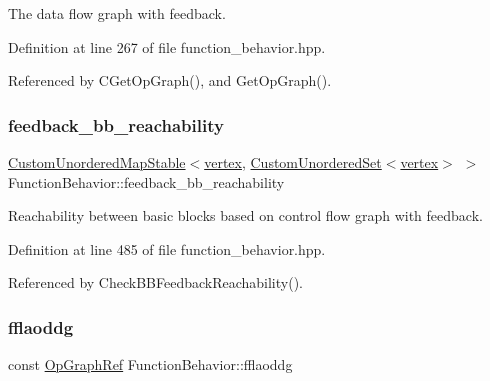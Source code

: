 The data flow graph with feedback. 



Definition at line 267 of file function\+\_\+behavior.\+hpp.



Referenced by C\+Get\+Op\+Graph(), and Get\+Op\+Graph().

\mbox{\label{classFunctionBehavior_ad606d4872a75037e3693e2e4f4b6f143}} 
\subsubsection{\texorpdfstring{feedback\+\_\+bb\+\_\+reachability}{feedback\_bb\_reachability}}
{\footnotesize\ttfamily \hyperlink{custom__map_8hpp_a7314a7df1cdb3a3acf478ab86e95c226}{Custom\+Unordered\+Map\+Stable}$<$\hyperlink{graph_8hpp_abefdcf0544e601805af44eca032cca14}{vertex}, \hyperlink{classCustomUnorderedSet}{Custom\+Unordered\+Set}$<$\hyperlink{graph_8hpp_abefdcf0544e601805af44eca032cca14}{vertex}$>$ $>$ Function\+Behavior\+::feedback\+\_\+bb\+\_\+reachability}



Reachability between basic blocks based on control flow graph with feedback. 



Definition at line 485 of file function\+\_\+behavior.\+hpp.



Referenced by Check\+B\+B\+Feedback\+Reachability().

\mbox{\label{classFunctionBehavior_a44d3fd29ffe2e6d10082a2df48e2a813}} 
\subsubsection{\texorpdfstring{fflaoddg}{fflaoddg}}
{\footnotesize\ttfamily const \hyperlink{op__graph_8hpp_aee97c95c40f791b60c451d9e29c72d39}{Op\+Graph\+Ref} Function\+Behavior\+::fflaoddg\hspace{0.3cm}{\ttfamily [private]}}




